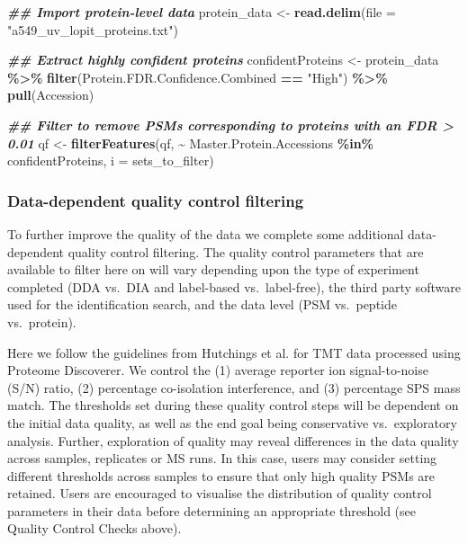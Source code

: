 \documentclass[9pt,a4paper,]{extarticle}
\newenvironment{Shaded}{\begin{snugshade}}{\end{snugshade}}
\newcommand{\AttributeTok}[1]{\textcolor[rgb]{0.13,0.29,0.53}{#1}}
\newcommand{\DocumentationTok}[1]{\textcolor[rgb]{0.56,0.35,0.01}{\textbf{\textit{#1}}}}
\newcommand{\FunctionTok}[1]{\textcolor[rgb]{0.13,0.29,0.53}{\textbf{#1}}}
\newcommand{\NormalTok}[1]{#1}
\newcommand{\OtherTok}[1]{\textcolor[rgb]{0.56,0.35,0.01}{#1}}
\newcommand{\SpecialCharTok}[1]{\textcolor[rgb]{0.81,0.36,0.00}{\textbf{#1}}}
\newcommand{\StringTok}[1]{\textcolor[rgb]{0.31,0.60,0.02}{#1}}
\begin{document}
\begin{Shaded}
\begin{Highlighting}[]
\DocumentationTok{\#\# Import protein{-}level data}
\NormalTok{protein\_data }\OtherTok{\textless{}{-}} \FunctionTok{read.delim}\NormalTok{(}\AttributeTok{file =} \StringTok{"a549\_uv\_lopit\_proteins.txt"}\NormalTok{)}

\DocumentationTok{\#\# Extract highly confident proteins}
\NormalTok{confidentProteins }\OtherTok{\textless{}{-}}\NormalTok{ protein\_data }\SpecialCharTok{\%\textgreater{}\%}
  \FunctionTok{filter}\NormalTok{(Protein.FDR.Confidence.Combined }\SpecialCharTok{==} \StringTok{"High"}\NormalTok{) }\SpecialCharTok{\%\textgreater{}\%} 
  \FunctionTok{pull}\NormalTok{(Accession)}

\DocumentationTok{\#\# Filter to remove PSMs corresponding to proteins with an FDR \textgreater{} 0.01}
\NormalTok{qf }\OtherTok{\textless{}{-}} \FunctionTok{filterFeatures}\NormalTok{(qf, }
                     \SpecialCharTok{\textasciitilde{}}\NormalTok{ Master.Protein.Accessions }\SpecialCharTok{\%in\%}\NormalTok{ confidentProteins, }
                     \AttributeTok{i =}\NormalTok{ sets\_to\_filter)}
\end{Highlighting}
\end{Shaded}

\subsubsection{Data-dependent quality control filtering}\label{data-dependent-quality-control-filtering}

To further improve the quality of the data we complete some additional
data-dependent quality control filtering. The quality control parameters that are
available to filter here on will vary depending upon the type of experiment
completed (DDA vs.~DIA and label-based vs.~label-free), the third party software
used for the identification search, and the data level (PSM vs.~peptide vs.~protein).

Here we follow the guidelines from Hutchings et al. \citep{Hutchings2023} for TMT data
processed using Proteome Discoverer. We control the (1) average reporter ion signal-to-noise (S/N)
ratio, (2) percentage co-isolation interference, and (3) percentage SPS mass match.
The thresholds set during these quality control steps will be dependent on the
initial data quality, as well as the end goal being conservative vs.~exploratory
analysis. Further, exploration of quality may reveal differences in the
data quality across samples, replicates or MS runs. In this case, users may consider
setting different thresholds across samples to ensure that only high quality PSMs
are retained. Users are encouraged to visualise the distribution of quality control
parameters in their data before determining an appropriate threshold (see Quality
Control Checks above).
\end{document}
